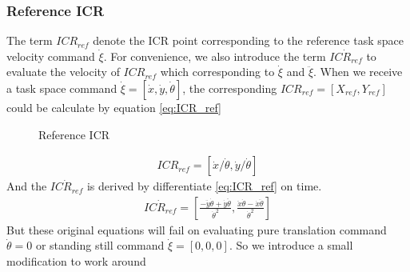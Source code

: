 \subsubsection{Reference ICR}
The term $ICR_{ref}$ denote the ICR point corresponding to the reference task space velocity command $\dot{\xi}$. For convenience, we also introduce the term $\dot{ICR_{ref}}$ to evaluate the velocity of $ICR_{ref}$ 
which corresponding to $\dot{\xi}$ and $\ddot{\xi}$.
When we receive a task space command $\dot{\xi}=[\dot{x},\dot{y},\dot{\theta}]$, the corresponding $ICR_{ref}=[X_{ref},Y_{ref}]$ could be calculate by equation \cref{eq:ICR_ref}
\begin{figure}[t]
	\begin{center}
	\resizebox{10cm}{!}
    {
		}
	\end{center}
	\caption{Reference ICR}
\end{figure}
\begin{equation}\label{eq:ICR_ref}
    \begin{split}
        ICR_{ref}=[\dot{x}/\dot{\theta},\dot{y}/\dot{\theta}]
    \end{split}
\end{equation}
And the $\dot{ICR_{ref}}$ is derived by differentiate \cref{eq:ICR_ref} on time.
\begin{equation}\label{eq:ICRdot_ref}
    \begin{split}
        \dot{ICR_{ref}}=[\frac{-\ddot{y}\dot{\theta}+\dot{y}\ddot{\theta}}{\dot{\theta}^2},\frac{\ddot{x}\dot{\theta}-\dot{x}\ddot{\theta}}{\dot{\theta}^2}]
    \end{split}
\end{equation}
But these original equations will fail on evaluating pure translation command $\dot{\theta}=0$ or standing still command $\dot{\xi}=[0, 0, 0]$. So we introduce a small modification to work around
